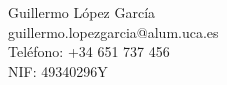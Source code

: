 Guillermo López García \\ %
guillermo.lopezgarcia@alum.uca.es \\ %
Teléfono: +34 651 737 456 \\ %
NIF: 49340296Y \\ %
